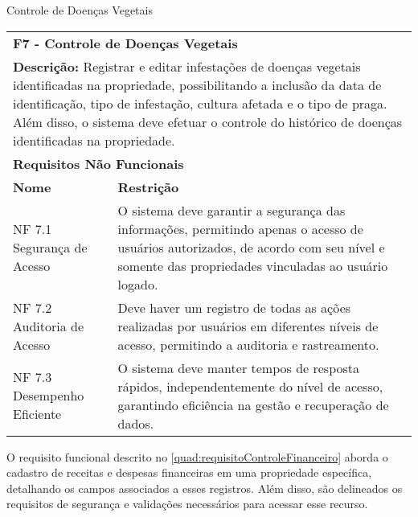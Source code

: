 \begin{tabframed}[htb]
  \caption{Controle de Doenças Vegetais}
  \label{quad:requisitoControleDoençasVegetais}
  \renewcommand{\arraystretch}{1.5}
  \begin{tabular}{|l|l|}
    \cline{1-2}
    \multicolumn{2}{|l|}{\textbf{F7 - Controle de Doenças Vegetais}}
    \\ \cline{1-2}

    \multicolumn{2}{|p{15cm}|}{
    \raggedright \textbf{Descrição:} Registrar e editar infestações de doenças vegetais identificadas na propriedade, possibilitando a inclusão da data de identificação, tipo de infestação, cultura afetada e o tipo de praga. Além disso, o sistema deve efetuar o controle do histórico de doenças identificadas na propriedade.
    }
    \\ \cline{1-2}

    \multicolumn{2}{|l|}{\textbf{Requisitos Não Funcionais}}
    \\ \cline{1-2}

    \textbf{Nome}               &
    \textbf{Restrição}
    \\ \cline{1-2}

    NF 7.1 Segurança de Acesso  &
    \multicolumn{1}{|p{8cm}|}{\raggedright O sistema deve garantir a segurança das informações, permitindo apenas o acesso de usuários autorizados, de acordo com seu nível e somente das propriedades vinculadas ao usuário logado.}
    \\ \cline{1-2}

    NF 7.2 Auditoria de Acesso  &
    \multicolumn{1}{|p{8cm}|}{\raggedright Deve haver um registro de todas as ações realizadas por usuários em diferentes níveis de acesso, permitindo a auditoria e rastreamento.}
    \\ \cline{1-2}

    NF 7.3 Desempenho Eficiente &
    \multicolumn{1}{|p{8cm}|}{\raggedright O sistema deve manter tempos de resposta rápidos, independentemente do nível de acesso, garantindo eficiência na gestão e recuperação de dados.}
    \\ \cline{1-2}
  \end{tabular}
  \fonte{} %
\end{tabframed}

O requisito funcional descrito no \autoref{quad:requisitoControleFinanceiro}  aborda o cadastro de receitas e despesas financeiras em uma propriedade específica, detalhando os campos associados a esses registros. Além disso, são delineados os requisitos de segurança e validações necessários para acessar esse recurso.

